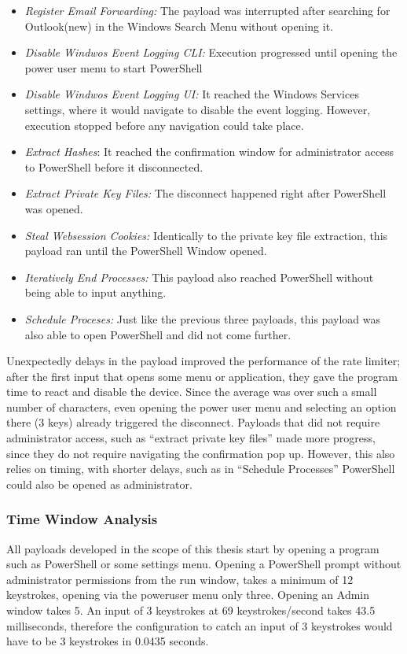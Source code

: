 \begin{itemize}
    \item  \emph{Register Email Forwarding:} The payload was interrupted after searching for Outlook(new) in the Windows Search Menu without opening it. 
    \item  \emph{Disable Windwos Event Logging CLI:} Execution progressed until opening the power user menu to start PowerShell
    \item  \emph{Disable Windwos Event Logging UI:} It reached the Windows Services settings, where it would navigate to disable the event logging. However, execution stopped before any navigation could take place. 
    \item  \emph{Extract Hashes}: It reached the confirmation window for administrator access to PowerShell before it disconnected.
    \item  \emph{Extract Private Key Files:} The disconnect happened right after PowerShell was opened.
    \item  \emph{Steal Websession Cookies:} Identically to the private key file extraction, this payload ran until the PowerShell Window opened.
    \item  \emph{Iteratively End Processes:} This payload also reached PowerShell without being able to input anything.
    \item  \emph{Schedule Proceses:} Just like the previous three payloads, this payload was also able to open PowerShell and did not come further.
\end{itemize}


Unexpectedly delays in the payload improved the performance of the rate limiter; after the first input that opens some menu or application, they gave the program time to react and disable the device. Since the average was over such a small number of characters, even opening the power user menu and selecting an option there (3 keys) already triggered the disconnect. Payloads that did not require administrator access, such as ``extract private key files'' made more progress, since they do not require navigating the confirmation pop up. However, this also relies on timing, with shorter delays, such as in ``Schedule Processes'' PowerShell could also be opened as administrator. 


\subsubsection{Time Window Analysis}

All payloads developed in the scope of this thesis start by opening a program such as PowerShell or some settings menu. Opening a PowerShell prompt without administrator permissions from the run window, takes a minimum of 12 keystrokes, opening via the poweruser menu only three. Opening an Admin window takes 5. 
An input of 3 keystrokes at 69 keystrokes/second takes 43.5 milliseconds, therefore the configuration to catch an input of 3 keystrokes would have to be 3 keystrokes in 0.0435 seconds.

